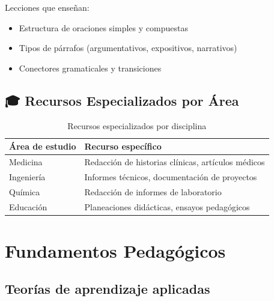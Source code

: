 \documentclass[12pt,spanish]{article}
\begin{document}
Lecciones que enseñan:

\begin{itemize}
    \item Estructura de oraciones simples y compuestas
    \item Tipos de párrafos (argumentativos, expositivos, narrativos)
    \item Conectores gramaticales y transiciones
\end{itemize}

\subsection{🎓 Recursos Especializados por Área}

\begin{table}[H]
\centering
\caption{Recursos especializados por disciplina}
\label{tab:especializados}
\begin{tabular}{|p{4cm}|p{9cm}|}
\hline
\textbf{Área de estudio} & \textbf{Recurso específico} \\
\hline
Medicina & Redacción de historias clínicas, artículos médicos \\
\hline
Ingeniería & Informes técnicos, documentación de proyectos \\
\hline
Química & Redacción de informes de laboratorio \\
\hline
Educación & Planeaciones didácticas, ensayos pedagógicos \\
\hline
\end{tabular}
\end{table}

\section{Fundamentos Pedagógicos}

\subsection{Teorías de aprendizaje aplicadas}
\end{document}
